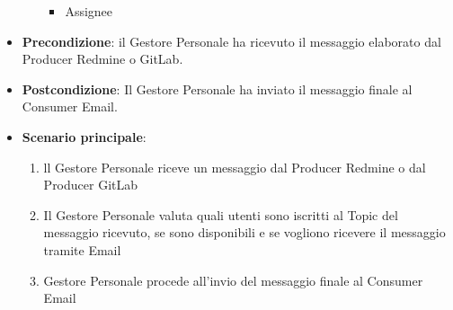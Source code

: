 \begin{itemize}
\begin{itemize}
\begin{itemize}
				\item Assignee
			\end{itemize}
		\end{itemize}
		\item \textbf{Precondizione}: il Gestore Personale ha ricevuto il messaggio elaborato dal Producer Redmine o GitLab.
		\item \textbf{Postcondizione}: Il Gestore Personale ha inviato il messaggio finale al Consumer Email.
		\item \textbf{Scenario principale}: 
		\begin{enumerate}
			\item ll Gestore Personale riceve un messaggio dal Producer Redmine o dal Producer GitLab
			\item Il Gestore Personale valuta quali utenti sono iscritti al Topic del messaggio ricevuto, se sono disponibili e se vogliono ricevere il messaggio tramite Email
			\item Gestore Personale procede all'invio del messaggio finale al Consumer Email
		\end{enumerate}
		
	\end{itemize}